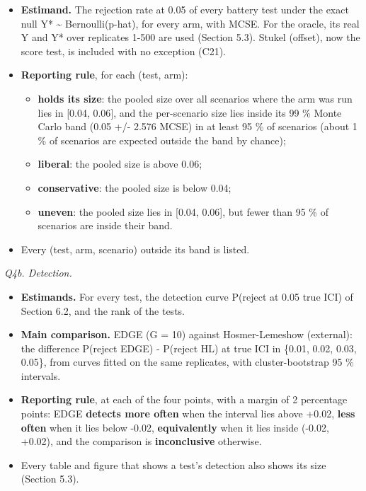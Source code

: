 \documentclass[
  10pt,
]{article}
\providecommand{\tightlist}{%
  \setlength{\itemsep}{0pt}\setlength{\parskip}{0pt}}
\begin{document}
\begin{itemize}
\tightlist
\item
  \textbf{Estimand.} The rejection rate at 0.05 of every
  battery test under the exact null Y* \textasciitilde{}
  Bernoulli(p-hat), for every arm, with MCSE. For the
  oracle, its real Y and Y* over replicates 1-500 are used
  (Section 5.3). Stukel (offset), now the score test, is
  included with no exception (C21).
\item
  \textbf{Reporting rule}, for each (test, arm):

  \begin{itemize}
  \tightlist
  \item
    \textbf{holds its size}: the pooled size over all
    scenarios where the arm was run lies in {[}0.04,
    0.06{]}, and the per-scenario size lies inside its 99 \%
    Monte Carlo band (0.05 +/- 2.576 MCSE) in at least 95 \%
    of scenarios (about 1 \% of scenarios are expected
    outside the band by chance);
  \item
    \textbf{liberal}: the pooled size is above 0.06;
  \item
    \textbf{conservative}: the pooled size is below 0.04;
  \item
    \textbf{uneven}: the pooled size lies in {[}0.04,
    0.06{]}, but fewer than 95 \% of scenarios are inside
    their band.
  \end{itemize}
\item
  Every (test, arm, scenario) outside its band is listed.
\end{itemize}

\emph{Q4b. Detection.}

\begin{itemize}
\tightlist
\item
  \textbf{Estimands.} For every test, the detection curve
  P(reject at 0.05 \textbar{} true ICI) of Section 6.2, and
  the rank of the tests.
\item
  \textbf{Main comparison.} EDGE (G = 10) against
  Hosmer-Lemeshow (external): the difference P(reject
  \textbar{} EDGE) - P(reject \textbar{} HL) at true ICI in
  \{0.01, 0.02, 0.03, 0.05\}, from curves fitted on the same
  replicates, with cluster-bootstrap 95 \% intervals.
\item
  \textbf{Reporting rule}, at each of the four points, with
  a margin of 2 percentage points: EDGE \textbf{detects more
  often} when the interval lies above +0.02, \textbf{less
  often} when it lies below -0.02, \textbf{equivalently}
  when it lies inside (-0.02, +0.02), and the comparison is
  \textbf{inconclusive} otherwise.
\item
  Every table and figure that shows a test's detection also
  shows its size (Section 5.3).
\end{itemize}
\end{document}
